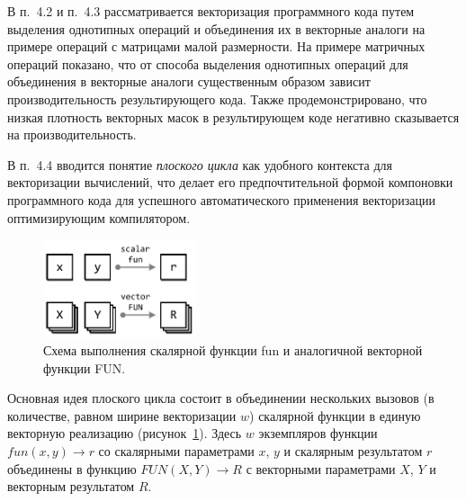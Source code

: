 \documentclass[a4paper,14pt]{extarticle}                     %
\theoremstyle{plain}                                         %
\begin{document}

В п.~4.2 и п.~4.3 рассматривается векторизация программного кода путем выделения однотипных операций и объединения их в векторные аналоги на примере операций с матрицами малой размерности.
На примере матричных операций показано, что от способа выделения однотипных операций для объединения в векторные аналоги существенным образом зависит производительность результирующего кода.
Также продемонстрировано, что низкая плотность векторных масок в результирующем коде негативно сказывается на производительность.


В п.~4.4 вводится понятие \textit{плоского цикла} как удобного контекста для векторизации вычислений, что делает его предпочтительной формой компоновки программного кода для успешного автоматического применения векторизации оптимизирующим компилятором.

\begin{figure}[ht]
\centering
\includegraphics[width=0.4\textwidth]{./pics/text_4_flat/fun.pdf}
\singlespacing
{}\caption{Схема выполнения скалярной функции fun и аналогичной векторной функции FUN.}
\label{fig:text_4_vec_flat_fun_FUN}
\end{figure}

Основная идея плоского цикла состоит в объединении нескольких вызовов (в количестве, равном ширине векторизации $w$) скалярной функции в единую векторную реализацию (рисунок~\ref{fig:text_4_vec_flat_fun_FUN}).
Здесь $w$ экземпляров функции $fun(x, y) \rightarrow r$ со скалярными параметрами $x$, $y$ и скалярным результатом $r$ объединены в функцию $FUN(X, Y) \rightarrow R$ с векторными параметрами $X$, $Y$ и векторным результатом $R$.
\end{document}
